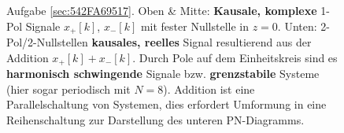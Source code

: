 \begin{figure}
%
\caption{Aufgabe \ref{sec:542FA69517}. Oben \& Mitte: \textbf{Kausale, komplexe}
1-Pol Signale $x_+[k]$, $x_-[k]$ mit fester Nullstelle in $z=0$.
Unten: 2-Pol/2-Nullstellen \textbf{kausales, reelles} Signal resultierend aus
der Addition $x_+[k]+x_-[k]$.
Durch Pole auf dem Einheitskreis sind es \textbf{harmonisch schwingende}
Signale bzw.
\textbf{grenzstabile} Systeme (hier sogar periodisch mit $N=8$).
Addition ist eine Parallelschaltung von Systemen, dies
erfordert Umformung in eine Reihenschaltung zur Darstellung des unteren
PN-Diagramms.}
\label{fig:542FA69517}
\end{figure}
